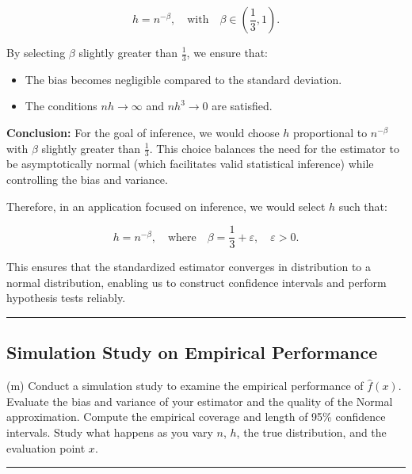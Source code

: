 \documentclass{article}
\newenvironment{colorparagraph}[1]{\par\color{#1}}{\par}
\begin{document}
\[
h = n^{-\beta}, \quad \text{with} \quad \beta \in \left( \frac{1}{3}, 1 \right).
\]

By selecting \( \beta \) slightly greater than \( \frac{1}{3} \), we ensure that:

\begin{itemize}
    \item The bias becomes negligible compared to the standard deviation.
    \item The conditions \( n h \to \infty \) and \( n h^3 \to 0 \) are satisfied.
\end{itemize}

\textbf{Conclusion:} For the goal of inference, we would choose \( h \) proportional to \( n^{-\beta} \) with \( \beta \) slightly greater than \( \frac{1}{3} \). This choice balances the need for the estimator to be asymptotically normal (which facilitates valid statistical inference) while controlling the bias and variance.

Therefore, in an application focused on inference, we would select \( h \) such that:

\[
h = n^{-\beta}, \quad \text{where} \quad \beta = \frac{1}{3} + \varepsilon, \quad \varepsilon > 0.
\]

This ensures that the standardized estimator converges in distribution to a normal distribution, enabling us to construct confidence intervals and perform hypothesis tests reliably.

\begin{colorparagraph}{questioncolor}
\label{q2m}
\rule{\textwidth}{0.5pt}
\subsection{Simulation Study on Empirical Performance}
(m) Conduct a simulation study to examine the empirical performance of \( \hat{f}(x) \). Evaluate the bias and variance of your estimator and the quality of the Normal approximation. Compute the empirical coverage and length of 95\% confidence intervals. Study what happens as you vary \( n \), \( h \), the true distribution, and the evaluation point \( x \).

\rule{\textwidth}{0.5pt}
\end{colorparagraph}
\end{document}
